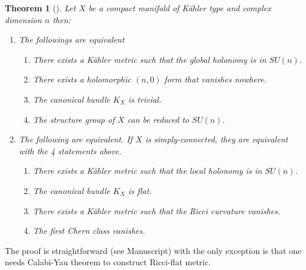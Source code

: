 \documentclass[11pt]{article}
\newtheorem{theorem}{Theorem}
\begin{document}
\begin{theorem}[]
Let \(X\) be a compact manifold of Kähler type and complex dimension \(n\) then:
\begin{enumerate}
\item The followings are equivalent
\begin{enumerate}
\item There exists a Kähler metric such that the global holonomy is in \(SU(n)\).
\item There exists a holomorphic \((n,0)\) form that vanishes nowhere.
\item The canonical bundle \(K_X\) is trivial.
\item The structure group of \(X\) can be reduced to \(SU(n)\).
\end{enumerate}
\item The following are equivalent. If \(X\) is simply-connected, they are equivalent with the 4
statements above.
\begin{enumerate}
\item There exists a Kähler metric such that the local holonomy is in \(SU(n)\).
\item The canonical bundle \(K_X\) is flat.
\item There exists a Kähler metric such that the Ricci curvature vanishes.
\item The first Chern class vanishes.
\end{enumerate}
\end{enumerate}
\end{theorem}

The proof is straightforward (see Manuscript) with the only exception is that one needs Calabi-Yau theorem to
construct Ricci-flat metric.
\end{document}
